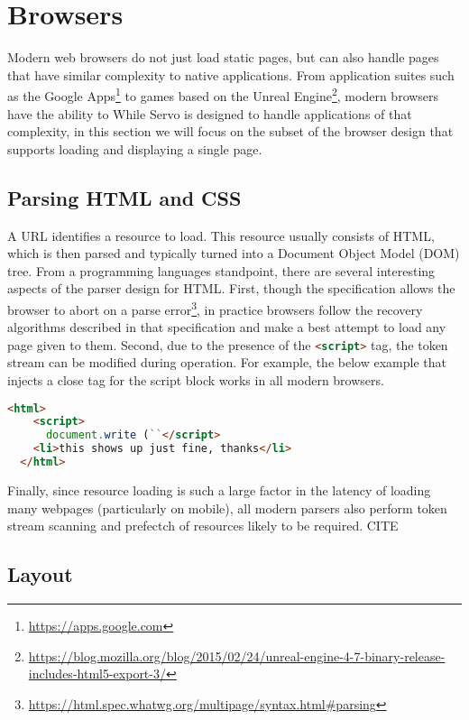 
\section{Browsers}
\label{sec:browsers}

Modern web browsers do not just load static pages, but can also handle pages that have similar
complexity to native applications.
From application suites such as the Google Apps\footnote{\url{https://apps.google.com}} to games
based on the Unreal Engine\footnote{\url{https://blog.mozilla.org/blog/2015/02/24/unreal-engine-4-7-binary-release-includes-html5-export-3/}},
modern browsers have the ability to
While Servo is designed to handle applications of that complexity, in this section we will
focus on the subset of the browser design that supports loading and displaying a single page.

\subsection{Parsing HTML and CSS}

A URL identifies a resource to load.
This resource usually consists of HTML, which is then parsed and typically turned into a Document Object
Model (DOM) tree.
From a programming languages standpoint, there are several interesting aspects of the parser design
for HTML.
First, though the specification allows the browser to abort on a parse error\footnote{\url{https://html.spec.whatwg.org/multipage/syntax.html#parsing}},
in practice browsers follow the recovery algorithms described in that specification and make a best attempt to
load any page given to them.
Second, due to the presence of the \lstinline[language=HTML]{<script>} tag, the token stream can be modified
during operation.
For example, the below example that injects a close tag for the script block works in all modern browsers.
\begin{lstlisting}[language=HTML]
  <html>
    <script>
      document.write (``</script>
    <li>this shows up just fine, thanks</li>
  </html>
\end{lstlisting}
Finally, since resource loading is such a large factor in the latency of loading many webpages (particularly on mobile),
all modern parsers also perform token stream scanning and prefectch of resources likely to be required. CITE

\subsection{Layout}

